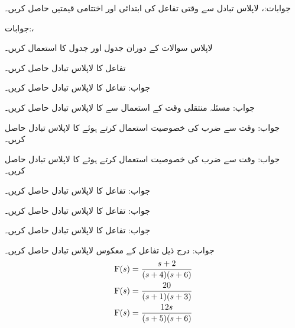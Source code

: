جوابات:، 
لاپلاس تبادل  سے وقتی تفاعل کی ابتدائی اور اختتامی قیمتیں حاصل کریں۔

جوابات:، 


لاپلاس سوالات کے دوران جدول  اور جدول  کا استعمال کریں۔

تفاعل  کا لاپلاس تبادل حاصل کریں۔

جواب:
تفاعل  کا لاپلاس تبادل حاصل کریں۔

جواب:
مسئلہ منتقلی وقت کے استعمال سے  کا لاپلاس تبادل حاصل کریں۔

جواب:
وقت سے ضرب کی خصوصیت استعمال کرتے ہوئے   کا لاپلاس تبادل حاصل کریں۔

جواب:
وقت سے ضرب کی خصوصیت استعمال کرتے ہوئے   کا لاپلاس تبادل حاصل کریں۔

جواب:
تفاعل  کا لاپلاس تبادل حاصل کریں۔

جواب:
تفاعل  کا لاپلاس تبادل حاصل کریں۔

جواب:
تفاعل  کا لاپلاس تبادل حاصل کریں۔

جواب:
درج ذیل تفاعل کے معکوس لاپلاس تبادل حاصل کریں۔
\begin{align*}
{\ensuremath{{\textup{F}}}}(s)&=\frac{s+2}{(s+4)(s+6)}\\
{{\textup{F}}}(s)&=\frac{20}{(s+1)(s+3)}\\
{{\textup{F}}}(s)&=\frac{12s}{(s+5)(s+6)}
\end{align*}

